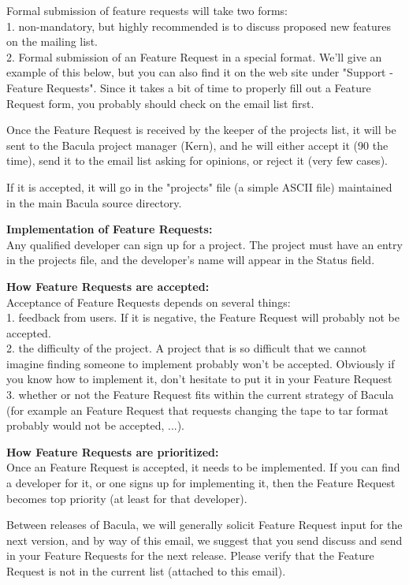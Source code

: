 Formal submission of feature requests will take two forms: \\
1. non-mandatory, but highly recommended is to discuss proposed new features
on the mailing list.\\
2.  Formal submission of an Feature Request in a special format.  We'll
give an example of this below, but you can also find it on the web site
under "Support -\gt{} Feature Requests".  Since it takes a bit of time to
properly fill out a Feature Request form, you probably should check on the
email list first.

Once the Feature Request is received by the keeper of the projects list, it
will be sent to the Bacula project manager (Kern), and he will either
accept it (90%
the time), send it to the email list asking for opinions, or reject it
(very few cases).

If it is accepted, it will go in the "projects" file (a simple ASCII file) 
maintained in the main Bacula source directory.

{\bf Implementation of Feature Requests:}\\
Any qualified developer can sign up for a project.  The project must have
an entry in the projects file, and the developer's name will appear in the
Status field.

{\bf How Feature Requests are accepted:}\\
Acceptance of Feature Requests depends on several things: \\
1.  feedback from users.  If it is negative, the Feature Request will probably not be
accepted.  \\
2.  the difficulty of the project.  A project that is so
difficult that we cannot imagine finding someone to implement probably won't
be accepted. Obviously if you know how to implement it, don't hesitate
to put it in your Feature Request  \\
 3.  whether or not the Feature Request fits within the current strategy of
Bacula (for example an Feature Request that requests changing the tape to
tar format probably would not be accepted, ...).

{\bf How Feature Requests are prioritized:}\\
Once an Feature Request is accepted, it needs to be implemented.  If you
can find a developer for it, or one signs up for implementing it, then the
Feature Request becomes top priority (at least for that developer).

Between releases of Bacula, we will generally solicit Feature Request input
for the next version, and by way of this email, we suggest that you send
discuss and send in your Feature Requests for the next release.  Please
verify that the Feature Request is not in the current list (attached to this email).

